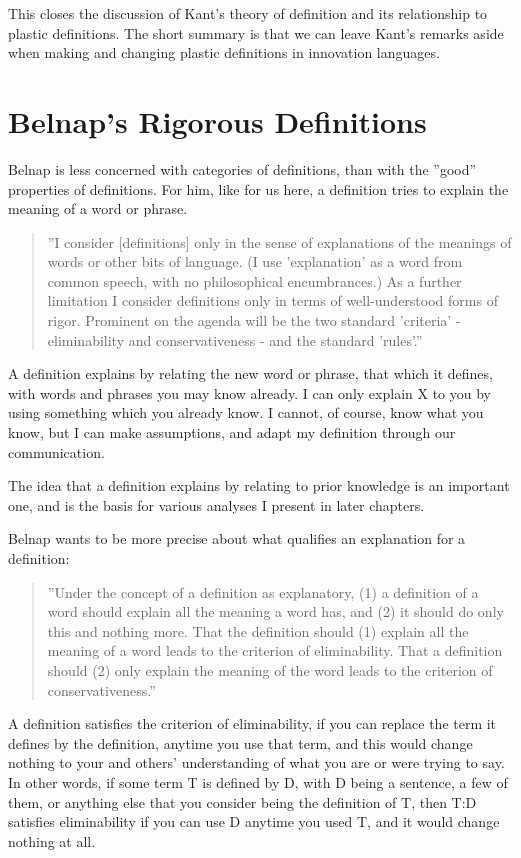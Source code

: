 This closes the discussion of Kant's theory of definition and its relationship to plastic definitions. The short summary is that we can leave Kant's remarks aside when making and changing plastic definitions in innovation languages.


\section{Belnap's Rigorous Definitions}
\label{c4:s3}
Belnap is less concerned with categories of definitions, than with the ''good'' properties of definitions. For him, like for us here, a definition tries to explain the meaning of a word or phrase.

\begin{quote}
''I consider [definitions] only in the sense of explanations of the meanings of words or other bits of language. (I use 'explanation' as a word from common speech, with no philosophical encumbrances.) As a further limitation I consider definitions only in terms of well-understood forms of rigor. Prominent on the agenda will be the two standard 'criteria' - eliminability and conservativeness - and the standard 'rules'.'' \cite{belnap1993rigorous}
\end{quote}

A definition explains by relating the new word or phrase, that which it defines, with words and phrases you may know already. I can only explain X to you by using something which you already know. I cannot, of course, know what you know, but I can make assumptions, and adapt my definition through our communication. 

The idea that a definition explains by relating to prior knowledge is an important one, and is the basis for various analyses I present in later chapters. 

Belnap wants to be more precise about what qualifies an explanation for a definition:

\begin{quote}
''Under the concept of a definition as explanatory, (1) a definition of a word should explain all the meaning a word has, and (2) it should do only this and nothing more. That the definition should (1) explain all the meaning of a word leads to the criterion of eliminability. That a definition should (2) only explain the meaning of the word leads to the criterion of conservativeness.'' \cite{belnap1993rigorous}
\end{quote}

A definition satisfies the criterion of eliminability, if you can replace the term it defines by the definition, anytime you use that term, and this would change nothing to your and others' understanding of what you are or were trying to say. In other words, if some term T is defined by D, with D being a sentence, a few of them, or anything else that you consider being the definition of T, then T:D satisfies eliminability if you can use D anytime you used T, and it would change nothing at all.

